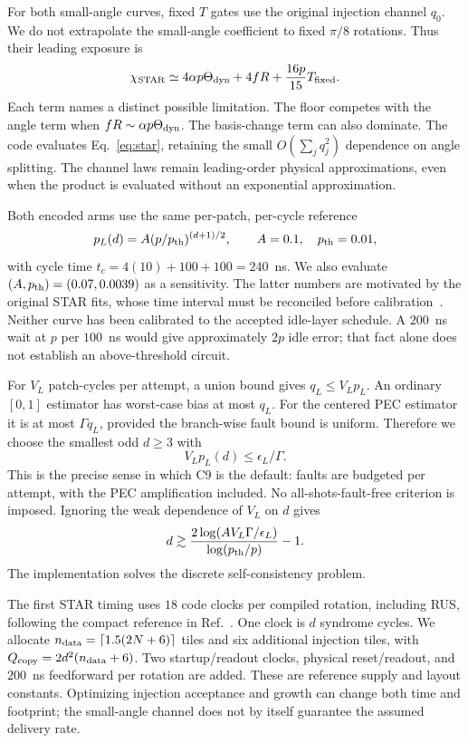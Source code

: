 \documentclass[11pt]{article}
\newcommand{\eps}{\epsilon}
\begin{document}
For both small-angle curves, fixed $T$ gates use the original injection
channel $q_0$. We do not extrapolate the small-angle coefficient to fixed
$\pi/8$ rotations. Thus their leading exposure is
\begin{equation}\label{eq:starcompiled}
 \chi_{\rm STAR}\simeq4\alpha p\Theta_{\rm dyn}+4fR
       +\frac{16p}{15}T_{\rm fixed}.
\end{equation}
Each term names a distinct possible limitation. The floor competes with the
angle term when $fR\sim\alpha p\Theta_{\rm dyn}$. The basis-change term can
also dominate. The code evaluates Eq.~\eqref{eq:star}, retaining the small
$O(\sum_jq_j^2)$ dependence on angle splitting. The channel laws remain
leading-order physical approximations, even when the product is evaluated
without an exponential approximation.

Both encoded arms use the same per-patch, per-cycle reference
\begin{equation}\label{eq:logical}
 p_L(d)=A(p/p_{\rm th})^{(d+1)/2},\qquad A=0.1,\quad p_{\rm th}=0.01,
\end{equation}
with cycle time $t_c=4(10)+100+100=240$~ns. We also evaluate
$(A,p_{\rm th})=(0.07,0.0039)$ as a sensitivity. The latter numbers are
motivated by the original STAR fits, whose time interval must be reconciled
before calibration~\cite{akahoshi}. Neither curve has been calibrated to
the accepted idle-layer schedule. A $200$~ns wait at $p$ per $100$~ns would
give approximately $2p$ idle error; that fact alone does not establish an
above-threshold circuit.

For $V_L$ patch-cycles per attempt, a union bound gives $q_L\leq V_Lp_L$.
An ordinary $[0,1]$ estimator has worst-case bias at most $q_L$. For the
centered PEC estimator it is at most $\Gamma q_L$, provided the branch-wise
fault bound is uniform. Therefore we choose the smallest odd $d\geq3$ with
\begin{equation}
 V_Lp_L(d)\leq\eps_L/\Gamma.
\end{equation}
This is the precise sense in which C9 is the default: faults are budgeted
per attempt, with the PEC amplification included. No all-shots-fault-free
criterion is imposed. Ignoring the weak dependence of $V_L$ on $d$ gives
\begin{equation}
 d\gtrsim\frac{2\log(AV_L\Gamma/\eps_L)}{\log(p_{\rm th}/p)}-1.
\end{equation}
The implementation solves the discrete self-consistency problem.

The first STAR timing uses $18$ code clocks per compiled rotation, including
RUS, following the compact reference in Ref.~\cite{akahoshi}. One clock
is $d$ syndrome cycles. We allocate
$n_{\rm data}=\lceil1.5(2N+6)\rceil$ tiles and six additional injection tiles,
with $Q_{\rm copy}=2d^2(n_{\rm data}+6)$. Two startup/readout clocks, physical
reset/readout, and $200$~ns feedforward per rotation are added. These are
reference supply and layout constants. Optimizing injection acceptance and
growth can change both time and footprint; the small-angle channel does not
by itself guarantee the assumed delivery rate.
\end{document}
